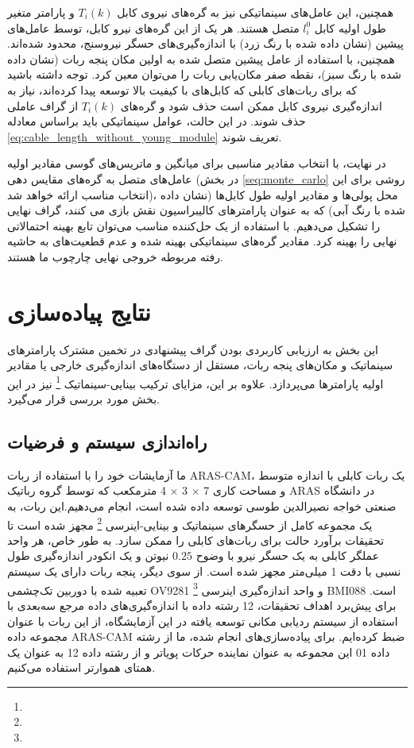 همچنین، این عامل‌های سینماتیکی نیز به گره‌های نیروی کابل
$T_i(k)$
و پارامتر متغیر طول اولیه کابل
$l_{i}^0$
 متصل هستند. هر یک از این گره‌های نیرو کابل، توسط عامل‌های پیشین (نشان داده شده با رنگ زرد) با اندازه‌گیری‌های حسگر نیروسنج، محدود شده‌اند. همچنین، با استفاده از عامل پیشین متصل شده به اولین مکان پنجه ربات (نشان داده شده با رنگ سبز)، نقطه صفر مکان‌یابی ربات را می‌توان معین کرد. توجه داشته باشید که برای ربات‌های کابلی که کابل‌های با کیفیت بالا توسعه پیدا کرده‌اند، نیاز به اندازه‌گیری نیروی کابل ممکن است حذف شود و گره‌های
$T_i(k)$
از گراف عاملی حذف شوند. در این حالت، عوامل سینماتیکی باید براساس معادله
\ref{eq:cable_length_without_young_module}
تعریف شوند. 

در نهایت، با انتخاب مقادیر مناسبی برای میانگین و ماتریس‌های گوسی مقادیر اولیه عامل‌های متصل به گره‌های مقایس دهی (در بخش 
\ref{seq:monte_carlo}
روشی برای این انتخاب مناسب ارائه خواهد شد)، محل پولی‌ها و مقادیر اولیه طول کابل‌ها (نشان‌ داده شده با رنگ آبی) که به عنوان پارامترهای کالیبراسیون نقش بازی می کنند، گراف نهایی را تشکیل می‌دهیم. با استفاده از یک حل‌کننده مناسب می‌توان تابع بهینه‌ احتمالاتی نهایی را بهینه کرد. مقادیر گره‌های سینماتیکی بهینه شده و عدم قطعیت‌های به حاشیه رفته مربوطه خروجی نهایی چارچوب ما هستند.

\section{نتایج پیاده‌سازی}
این بخش به ارزیابی کاربردی بودن گراف پیشنهادی در تخمین مشترک پارامترهای سینماتیک و مکان‌های پنجه ربات، مستقل از دستگاه‌های اندازه‌گیری خارجی یا مقادیر اولیه پارامترها می‌پردازد. علاوه بر این، مزایای ترکیب بینایی-سینماتیک
\footnote{}
 نیز در این بخش مورد بررسی قرار می‌گیرد.

\subsection{راه‌اندازی سیستم و فرضیات}
ما آزمایشات خود را با استفاده از ربات ARAS-CAM، یک ربات کابلی با اندازه متوسط و مساحت کاری 7 × 3 × 4 مترمکعب که توسط گروه رباتیک ARAS در دانشگاه صنعتی خواجه نصیرالدین طوسی توسعه داده شده است، انجام می‌دهیم.این ربات، به یک مجموعه کامل از حسگرهای سینماتیک و بینایی-اینرسی
\footnote{}
 مجهز شده است تا تحقیقات برآورد حالت برای ربات‌های کابلی را ممکن سازد. به طور خاص، هر واحد عملگر کابلی به یک حسگر نیرو با وضوح 
 $0.25$
  نیوتن و یک انکودر اندازه‌گیری طول نسبی با دقت 1 میلی‌متر مجهز شده است. از سوی دیگر، پنجه ربات دارای یک سیستم تعبیه شده با دوربین تک‌چشمی OV9281 
 \footnote{}
 و واحد اندازه‌گیری اینرسی BMI088 است. برای پیش‌برد اهداف تحقیقات، 12 رشته داده با اندازه‌گیری‌های داده مرجع سه‌بعدی با استفاده از سیستم ردیابی مکانی توسعه یافته در این آزمایشگاه، از این ربات با عنوان مجموعه داده ARAS-CAM ضبط کرده‌ایم. برای پیاده‌سازی‌های انجام شده، ما از رشته داده 01 این مجموعه به عنوان نماینده حرکات پویاتر و از رشته داده 12 به عنوان یک همتای هموارتر استفاده می‌کنیم.


